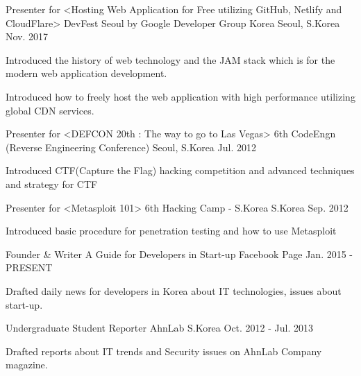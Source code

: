 \documentclass[11pt, a4paper]{../awesome-cv}
\begin{document}
\begin{cventries}

\cventry
    {Presenter for <Hosting Web Application for Free utilizing GitHub, Netlify and CloudFlare>} {DevFest Seoul by Google Developer Group Korea} {Seoul, S.Korea} {Nov. 2017} {
      \begin{cvitems} \item {Introduced the history of web technology and the JAM stack which is for the modern web application development.}
        \item {Introduced how to freely host the web application with high performance utilizing global CDN services.}
      \end{cvitems}
    }

\cventry
    {Presenter for <DEFCON 20th : The way to go to Las Vegas>} {6th CodeEngn (Reverse Engineering Conference)} {Seoul, S.Korea} {Jul. 2012} {
      \begin{cvitems} \item {Introduced CTF(Capture the Flag) hacking competition and advanced techniques and strategy for CTF}
      \end{cvitems}
    }

\cventry
    {Presenter for <Metasploit 101>} {6th Hacking Camp - S.Korea} {S.Korea} {Sep. 2012} {
      \begin{cvitems} \item {Introduced basic procedure for penetration testing and how to use Metasploit}
      \end{cvitems}
    }

\end{cventries}


\begin{cventries}

\cventry
    {Founder \& Writer} {A Guide for Developers in Start-up} {Facebook Page} {Jan. 2015 - PRESENT} {
      \begin{cvitems} \item {Drafted daily news for developers in Korea about IT technologies, issues about start-up.}
      \end{cvitems}
    }

\cventry
    {Undergraduate Student Reporter} {AhnLab} {S.Korea} {Oct. 2012 - Jul. 2013} {
      \begin{cvitems} \item {Drafted reports about IT trends and Security issues on AhnLab Company magazine.}
      \end{cvitems}
    }

\end{cventries}
\end{document}
